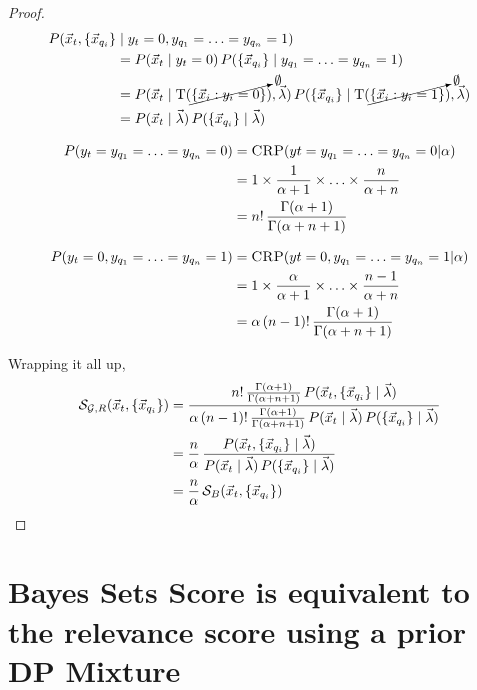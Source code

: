 \documentclass{article}
\newcommand{\set}[1]{\{{#1}\}}
\theoremstyle{break}
\begin{document}
\begin{proof}
      \begin{align}
        P(\target, \queryset &\mid \yt = 0, \sameyq = 1) \\
        & = P(\target \mid \yt=0) \, P(\queryset \mid \sameyq=1) \\
        & = P(\target \mid 
            \sstats(\cancelto{\emptyset}{\set{\vec x_i: y_i=0}}), \hypers)
            \, P(\queryset \mid 
            \sstats(\cancelto{\emptyset}{\set{\vec x_i: y_i=1}}), \hypers) \\
        & = P(\target \mid \hypers) \, P(\queryset \mid \hypers) \\
      \end{align}

      \begin{align}
        P(y_t = y_{q_1}=\ldots=y_{q_n} = 0) &= \textsc{CRP}(yt = y_{q_1}=\ldots=y_{q_n} = 0 | \alpha) \\
        &=1 \times \frac{1}{\alpha + 1}\times \ldots \times 
            \frac{n}{\alpha+n}\\
        &= n! \, \frac{\Gamma(\alpha+1)}{\Gamma(\alpha+n+1)}
      \end{align}

      \begin{align}
        P(y_t = 0, y_{q_1}=\ldots=y_{q_n} = 1) &= \textsc{CRP}(yt = 0, y_{q_1}=\ldots=y_{q_n} = 1 | \alpha) \\
        &=1 \times \frac{\alpha}{\alpha + 1}\times \ldots
            \times \frac{n-1}{\alpha+n}\\
        &= \alpha \, (n-1)! \, \frac{\Gamma(\alpha+1)}{\Gamma(\alpha+n+1)}
      \end{align}

    Wrapping it all up,
    \begin{align}
      \rscore(\target, \queryset) &= 
          \dfrac{n! \, \frac{\Gamma(\alpha+1)}{\Gamma(\alpha+n+1)}\,
          P(\target, \queryset \mid \hypers)}
          {\alpha \, (n-1)! \, \frac{\Gamma(\alpha+1)}{\Gamma(\alpha+n+1)}\,
          P(\target \mid \hypers) \, P(\queryset \mid \hypers)} \\
      & = \frac{n}{\alpha} \, \frac{P(\target, \queryset \mid \hypers)}
          {P(\target \mid \hypers) \, P(\queryset \mid \hypers)} \\
      & =  \frac{n}{\alpha} \, \mS_B(\target, \queryset)
    \end{align}


    \end{proof}

\section{Bayes Sets Score is equivalent to the relevance
  score using a prior DP Mixture}
\end{document}
